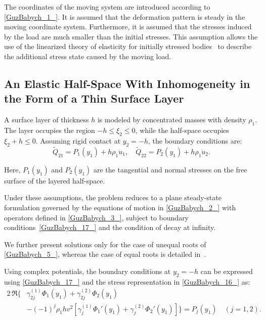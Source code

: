 The coordinates of the moving system are introduced according to \eqref{GuzBabych_1_}. It is assumed that the deformation pattern is steady in the moving coordinate system. Furthermore, it is assumed that the stresses induced by the load are much smaller than the initial stresses. This assumption allows the use of the linearized theory of elasticity for initially stressed bodies~\cite{GuzBabych9} to describe the additional stress state caused by the moving load.

\subsection{An Elastic Half-Space With Inhomogeneity in the Form of a Thin Surface Layer}
\label{GuzBabychSec3_1}

A surface layer of thickness $h$ is modeled by concentrated masses with density $\rho_1$. The layer occupies the region $-h \le \xi_2 \le 0$, while the half-space occupies $\xi_2 + h \le 0$. Assuming rigid contact at $y_2 = -h$, the boundary conditions are:
\begin{equation} \label{GuzBabych_17_}
    \tilde{Q}_{21} = P_1(y_1) + h \rho_1 \ddot{u}_1, \quad \tilde{Q}_{22} = P_2(y_1) + h \rho_1 \ddot{u}_2.
\end{equation}

\noindent Here, $P_1(y_1)$ and $P_2(y_1)$ are the tangential and normal stresses on the free surface of the layered half-space.

Under these assumptions, the problem reduces to a plane steady-state formulation governed by the equations of motion in \eqref{GuzBabych_2_} with operators defined in \eqref{GuzBabych_3_}, subject to boundary conditions~\eqref{GuzBabych_17_} and the condition of decay at infinity.

We further present solutions only for the case of unequal roots of \eqref{GuzBabych_5_}, whereas the case of equal roots is detailed in~\cite{GuzBabych10}.

Using complex potentials, the boundary conditions at $y_2 = -h$ can be expressed using \eqref{GuzBabych_17_} and the stress representation in \eqref{GuzBabych_16_} as:
\begin{equation} \label{GuzBabych_18_}
    \begin{aligned}
        2\,\Re \big\{ & \gamma_{2j}^{(1)} \Phi_1(y_1) + \gamma_{2j}^{(2)} \Phi_2(y_1) \\
        & - (-1)^j \rho_1 h v^2 [\gamma_j^{(1)} \Phi_1'(y_1) + \gamma_j^{(2)} \Phi_2'(y_1)] \big\}
        = P_j(y_1) \quad (j = 1,2).
    \end{aligned}
\end{equation}

